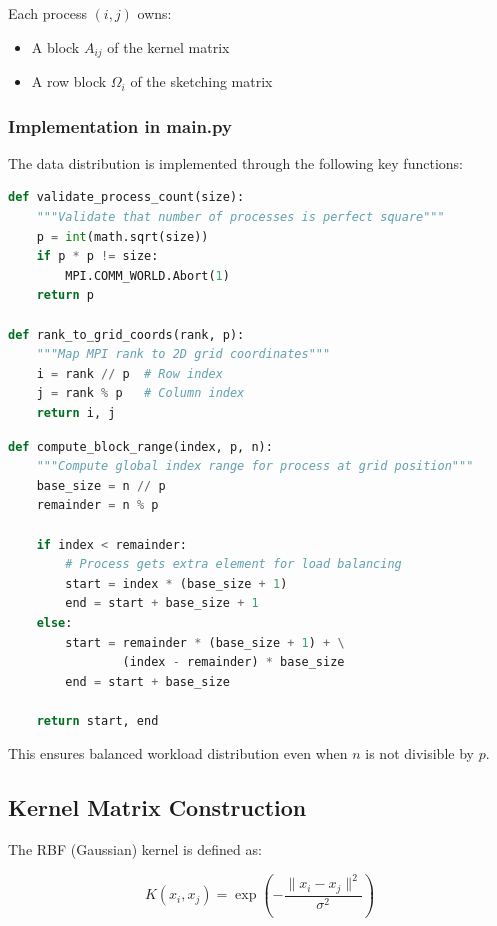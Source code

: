 \documentclass[11pt,a4paper]{article}
\begin{document}
Each process $(i, j)$ owns:
\begin{itemize}
    \item A block $A_{ij}$ of the kernel matrix
    \item A row block $\Omega_i$ of the sketching matrix
\end{itemize}

\subsubsection{Implementation in main.py}

The data distribution is implemented through the following key functions:

\begin{lstlisting}[language=Python, caption={Process grid initialization}]
def validate_process_count(size):
    """Validate that number of processes is perfect square"""
    p = int(math.sqrt(size))
    if p * p != size:
        MPI.COMM_WORLD.Abort(1)
    return p

def rank_to_grid_coords(rank, p):
    """Map MPI rank to 2D grid coordinates"""
    i = rank // p  # Row index
    j = rank % p   # Column index
    return i, j
\end{lstlisting}

\begin{lstlisting}[language=Python, caption={Block range computation with load balancing}]
def compute_block_range(index, p, n):
    """Compute global index range for process at grid position"""
    base_size = n // p
    remainder = n % p
    
    if index < remainder:
        # Process gets extra element for load balancing
        start = index * (base_size + 1)
        end = start + base_size + 1
    else:
        start = remainder * (base_size + 1) + \
                (index - remainder) * base_size
        end = start + base_size
    
    return start, end
\end{lstlisting}

This ensures balanced workload distribution even when $n$ is not divisible by $p$.

\subsection{Kernel Matrix Construction}

The RBF (Gaussian) kernel is defined as:

\begin{equation}
K(x_i, x_j) = \exp\left(-\frac{\|x_i - x_j\|^2}{\sigma^2}\right)
\label{eq:rbf}
\end{equation}
\end{document}

